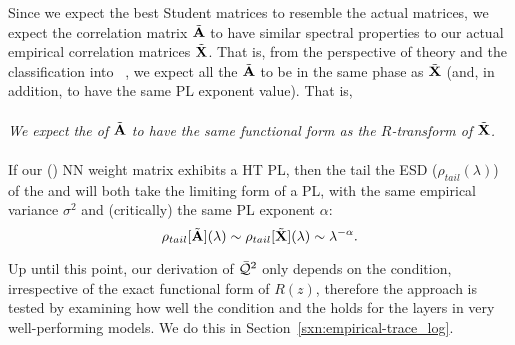 
%
%

Since we expect the best Student matrices to resemble the actual \Teacher matrices, we expect the \Student correlation matrix $\tilde{\mathbf{A}}$ to have similar spectral properties to our actual empirical correlation matrices $\tilde{\mathbf{X}}$.
That is, from the perspective of \HTSR theory and the classification into \PhasesOfTraining~\cite{MM18_TR_JMLRversion}, we expect all the $\tilde{\mathbf{A}}$ to be in the same phase as $\tilde{\mathbf{X}}$ (and, in addition, to have the same PL exponent value).   That is, 
\\
\\
\emph{We expect the \RTransform of $\tilde{\mathbf{A}}$ to have the same functional form as the $R$-transform of $\tilde{\mathbf{X}}$.}
\\
\\
If our (\Teacher) NN weight matrix exhibits a HT PL, then the tail the ESD ($\rho_{tail}(\lambda)$) of the \Student and \Teacher will both take the limiting form of a PL, with the same empirical variance $\sigma^{2}$ and (critically) the same PL exponent $\alpha$:
\begin{equation}
\label{eqn:R_PL}
  \rho_{tail}[\tilde{\mathbf{A}}](\lambda)\sim\rho_{tail}[\tilde{\mathbf{X}}](\lambda)\sim\lambda^{-\alpha}.
\end{equation}

Up until this point, our derivation of $\bar{\mathcal{Q}}^{2}$ only depends on the \TRACELOG condition, irrespective of the exact functional form of $R(z)$,
therefore the \SETOL approach is tested by examining how well the \TRACELOG condition and the \ECS holds for the layers in very well-performing models.
We do this in Section~\ref{sxn:empirical-trace_log}.





